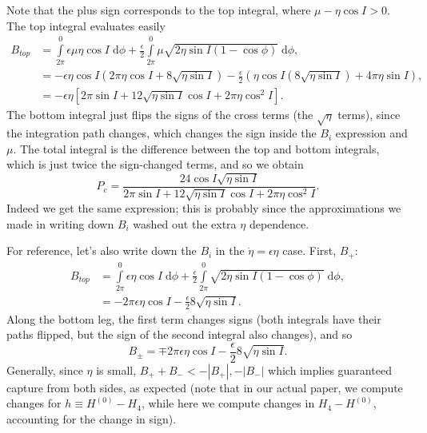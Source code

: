 \documentclass[11pt,
        usenames, %
        dvipsnames %
    ]{article}
\newcommand*{\abs}[1]{\left|#1\right|}
\newcommand*{\p}[1]{\left(#1\right)}
\newcommand*{\s}[1]{\left[#1\right]}
\begin{document}
Note that the plus sign corresponds to the top integral, where $\mu - \eta \cos
I > 0$. The top integral evaluates easily
\begin{align*}
    B_{top} &= \int\limits_{2\pi}^0 \epsilon \mu \eta \cos I\;\mathrm{d}\phi
            + \frac{\epsilon}{2}\int\limits_{2\pi}^0
                \mu\sqrt{2\eta \sin I\p{1 - \cos \phi}}\;\mathrm{d}\phi,\\
        &= -\epsilon \eta \cos I\p{2\pi \eta \cos I + 8\sqrt{\eta \sin I}}
            - \frac{\epsilon}{2}\p{\eta \cos I (8\sqrt{\eta \sin I})
            + 4\pi \eta \sin I},\\
        &= -\epsilon \eta \s{
            2\pi \sin I + 12\sqrt{\eta \sin I}\cos I + 2\pi \eta \cos^2 I}.
\end{align*}
The bottom integral just flips the signs of the cross terms (the $\sqrt{\eta}$
terms), since the integration path changes, which changes the sign inside the
$B_i$ expression and $\mu$. The total integral is the difference between the top
and bottom integrals, which is just twice the sign-changed terms, and so we
obtain
\begin{equation}
    P_c = \frac{24\cos I \sqrt{\eta \sin I}}{
            2\pi \sin I + 12\sqrt{\eta \sin I}\cos I + 2\pi \eta \cos^2 I}.
\end{equation}
Indeed we get the same expression; this is probably since the approximations we
made in writing down $B_i$ washed out the extra $\eta$ dependence.

For reference, let's also write down the $B_i$ in the $\dot{\eta} = \epsilon
\eta$ case. First, $B_{+}$:
\begin{align*}
    B_{top} &= \int\limits_{2\pi}^0 \epsilon \eta \cos I\;\mathrm{d}\phi
            + \frac{\epsilon}{2}\int\limits_{2\pi}^0
                \sqrt{2\eta \sin I\p{1 - \cos \phi}}\;\mathrm{d}\phi,\\
        &= -2\pi \epsilon \eta \cos I - \frac{\epsilon}{2}8\sqrt{\eta \sin I}.
\end{align*}
Along the bottom leg, the first term changes signs (both integrals have their
paths flipped, but the sign of the second integral also changes), and so
\begin{equation}
    B_{\pm} = \mp 2\pi \epsilon \eta \cos I
        - \frac{\epsilon}{2}8\sqrt{\eta \sin I}.
\end{equation}
Generally, since $\eta$ is small, $B_{+} + B_- < -\abs{B_+}, -\abs{B_-}$ which
implies guaranteed capture from both sides, as expected (note that in our actual
paper, we compute changes for $h \equiv H^{(0)} - H_4$, while here we compute
changes in $H_4 - H^{(0)}$, accounting for the change in sign).
\end{document}
